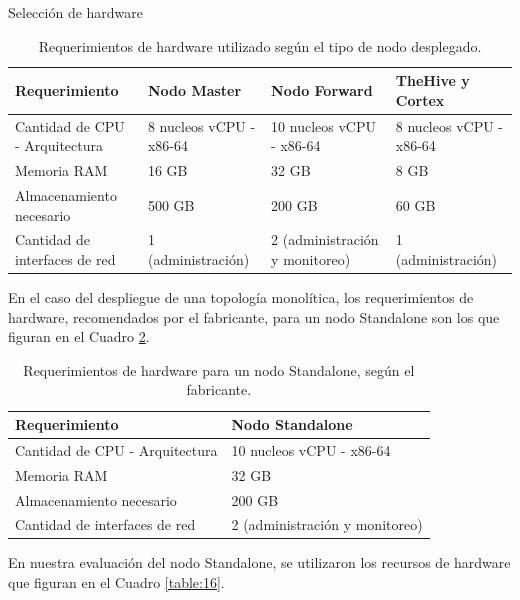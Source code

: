 \begin{section}{Selección de hardware}
        \begin{table}[H]
        \centering
        \begin{tabular}{|m{9em}|m{9em}|m{9em}|m{9em}|}
        
            \hline 
                Requerimiento  & Nodo Master &  Nodo Forward & TheHive y Cortex \\ 
            \hline
                Cantidad de CPU - Arquitectura & 8 nucleos vCPU - x86-64 & 10 nucleos vCPU - x86-64 & 8 nucleos vCPU - x86-64 \\ 
            \hline
                Memoria RAM  & 16 GB & 32 GB & 8 GB \\ 
            \hline
                Almacenamiento necesario & 500 GB  & 200 GB & 60 GB \\
            \hline
        Cantidad de interfaces de red & 1 (administración) & 2 (administración y monitoreo) & 1 (administración) \\
            \hline %
        \end{tabular}
        \caption{Requerimientos de hardware utilizado según el tipo de nodo desplegado.}
        \label{table:12}
        \end{table}
        \FloatBarrier
        En el caso del despliegue de una topología monolítica, los requerimientos de hardware, recomendados por el fabricante, para un nodo Standalone son los que figuran en el Cuadro \ref{table:15}. \par 
        
         \begin{table}[H]
        \centering
        \begin{tabular}{|m{10em}|m{10em}|}
        
            \hline 
                Requerimiento  & Nodo Standalone \\ 
            \hline
                Cantidad de CPU - Arquitectura &  10 nucleos vCPU - x86-64  \\ 
            \hline
                Memoria RAM  &  32 GB  \\ 
            \hline
                Almacenamiento necesario   & 200 GB  \\
            \hline
        Cantidad de interfaces de red  & 2 (administración y monitoreo) \\
            \hline %
        \end{tabular}
        \caption{Requerimientos de hardware para un nodo Standalone, según el fabricante.}
        \label{table:15}
        \end{table}
        \FloatBarrier 
        En nuestra evaluación del nodo Standalone, se utilizaron los recursos de hardware que figuran en el Cuadro \ref{table:16}.
        \begin{table}[H]
        \centering
        \begin{tabular}{|m{10em}|m{10em}|}
        

\end{tabular}
\end{table}
\end{section}
